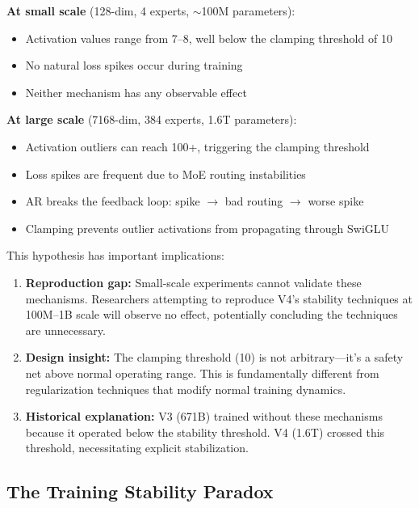 \documentclass[11pt,a4paper]{article}
\begin{document}
\textbf{At small scale} (128-dim, 4 experts, $\sim$100M parameters):
\begin{itemize}
    \item Activation values range from 7--8, well below the clamping threshold of 10
    \item No natural loss spikes occur during training
    \item Neither mechanism has any observable effect
\end{itemize}

\textbf{At large scale} (7168-dim, 384 experts, 1.6T parameters):
\begin{itemize}
    \item Activation outliers can reach 100+, triggering the clamping threshold
    \item Loss spikes are frequent due to MoE routing instabilities
    \item AR breaks the feedback loop: spike $\to$ bad routing $\to$ worse spike
    \item Clamping prevents outlier activations from propagating through SwiGLU
\end{itemize}

This hypothesis has important implications:

\begin{enumerate}[label=(\arabic*)]
    \item \textbf{Reproduction gap:} Small-scale experiments cannot validate these mechanisms. Researchers attempting to reproduce V4's stability techniques at 100M--1B scale will observe no effect, potentially concluding the techniques are unnecessary.
    
    \item \textbf{Design insight:} The clamping threshold (10) is not arbitrary---it's a safety net above normal operating range. This is fundamentally different from regularization techniques that modify normal training dynamics.
    
    \item \textbf{Historical explanation:} V3 (671B) trained without these mechanisms because it operated below the stability threshold. V4 (1.6T) crossed this threshold, necessitating explicit stabilization.
\end{enumerate}

\subsection{The Training Stability Paradox}
\end{document}
